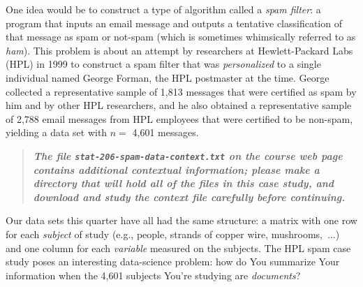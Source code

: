 \documentclass[12pt]{article}
\newcommand{\bi}[1]{\textbf{\textit{#1}}}
\begin{document}
One idea would be to construct a type of algorithm called a \textit{spam filter}: a program that inputs an email message and outputs a tentative classification of that message as spam or not-spam (which is sometimes whimsically referred to as \textit{ham}). This problem is about an attempt by researchers at Hewlett-Packard Labs (HPL) in 1999 to construct a spam filter that was \textit{personalized} to a single individual named George Forman, the HPL postmaster at the time. George collected a representative sample of 1,813 messages that were certified as spam by him and by other HPL researchers, and he also obtained a representative sample of 2,788 email messages from HPL employees that were certified to be non-spam, yielding a data set with $n =$ 4,601 messages. 

\begin{quote}

\bi{The file \texttt{stat-206-spam-data-context.txt} on the course web page contains additional contextual information; please make a directory that will hold all of the files in this case study, and download and study the context file carefully before continuing.}

\end{quote}

Our data sets this quarter have all had the same structure: a matrix with one row for each \textit{subject} of study (e.g., people, strands of copper wire, mushrooms,~...) and one column for each \textit{variable} measured on the subjects. The HPL spam case study poses an interesting data-science problem: how do You summarize Your information when the 4,601 subjects You're studying are \textit{documents}?
\end{document}
